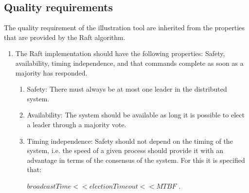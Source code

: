 \subsection{Quality requirements}
The quality requirement of the illustration tool are inherited from the properties that are provided by the Raft algorithm.
	\begin{enumerate}
	\item The Raft implementation should have the following properties: Safety, availability, timing independence, and that commands complete as soon as a majority has responded.
		\begin{enumerate}
		\item Safety: There must always be at most one leader in the distributed system.
		\item Availability: The system should be available as long it is possible to elect a leader through a majority vote.
		\item Timing independence: Safety should not depend on the timing of the system, i.e. the speed of a given process should provide it with an advantage in terms of the consensus of the system. For this it is specified that:
		\begin{center}
		$broadcastTime << electionTimeout << MTBF$ \cite{Raft}.
		\end{center}
		\end{enumerate}
	\end{enumerate}

